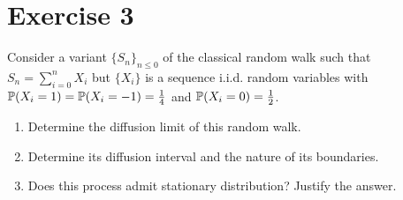 \documentclass[12pt]{article}
\begin{document}
	\section*{Exercise 3}
	Consider a variant ${\{S_{n}\}}_{n\leq0}$ of the classical random walk such that $S_{n}=\sum_{i=0}^{n}X_{i}$ but $\{X_{i}\}$ is a sequence i.i.d. random variables with $\mathbb{P}(X_{i}=1)=\mathbb{P}(X_{i}=-1)=\frac{1}{4}$ and $\mathbb{P}(X_{i}=0)=\frac{1}{2}$.
	\begin{enumerate}
		\item Determine the diffusion limit of this random walk.
		\item Determine its diffusion interval and the nature of its boundaries.
		\item Does this process admit stationary distribution? Justify the answer.
	\end{enumerate}
\end{document}
